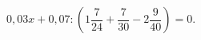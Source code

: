 \begin{ex}[type=equation]
	\begin{condition}
		$0,03x + 0,07: \left(1\dfrac{7}{24} + \dfrac{7}{30} - 2\dfrac{9}{40}\right) = 0.$
	\end{condition}
\end{ex}